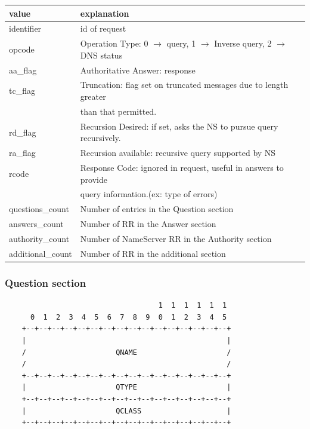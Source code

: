 \begin{tabular}{l|l}
value & explanation \\
\hline
identifier & id of request\\
\hline
opcode & Operation Type: 0 $\rightarrow$ query, 1 $\rightarrow$ Inverse query, 2 $\rightarrow$ DNS status\\
\hline
aa\_flag & Authoritative Answer: response \\
\hline
tc\_flag & Truncation: flag set on truncated messages due to length greater\\ & than that permitted.\\
\hline
rd\_flag & Recursion Desired: if set, asks the NS to pursue query recursively.\\
\hline
ra\_flag & Recursion available: recursive query supported by NS\\
\hline
rcode  & Response Code: ignored in request, useful in answers to provide\\ & query information.(ex: type of errors)\\
\hline
questions\_count  & Number of entries in the Question section\\
\hline
answers\_count  & Number of RR in the Answer section\\
\hline
authority\_count  & Number of NameServer RR in the Authority section\\
\hline
additional\_count  & Number of RR in the additional section\\
\hline
\end{tabular}



\subsubsection{Question section}

\begin{verbatim}
                                    1  1  1  1  1  1
      0  1  2  3  4  5  6  7  8  9  0  1  2  3  4  5
    +--+--+--+--+--+--+--+--+--+--+--+--+--+--+--+--+
    |                                               |
    /                     QNAME                     /
    /                                               /
    +--+--+--+--+--+--+--+--+--+--+--+--+--+--+--+--+
    |                     QTYPE                     |
    +--+--+--+--+--+--+--+--+--+--+--+--+--+--+--+--+
    |                     QCLASS                    |
    +--+--+--+--+--+--+--+--+--+--+--+--+--+--+--+--+
\end{verbatim}

